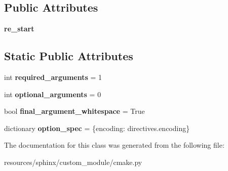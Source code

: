 \subsection*{Public Attributes}
\begin{DoxyCompactItemize}
\item 
\mbox{\label{classcmake_1_1CMakeModule_a8bdaac2e5425f8a443a797e31a2e3f24}} 
{\bfseries re\+\_\+start}
\end{DoxyCompactItemize}
\subsection*{Static Public Attributes}
\begin{DoxyCompactItemize}
\item 
\mbox{\label{classcmake_1_1CMakeModule_a8611294687a040b621ee65c24bdf4bf3}} 
int {\bfseries required\+\_\+arguments} = 1
\item 
\mbox{\label{classcmake_1_1CMakeModule_a5b3ba9afdee1ce2a9ef4a4372804586b}} 
int {\bfseries optional\+\_\+arguments} = 0
\item 
\mbox{\label{classcmake_1_1CMakeModule_a9101f08e555f3d9e7f45d766194bc50f}} 
bool {\bfseries final\+\_\+argument\+\_\+whitespace} = True
\item 
\mbox{\label{classcmake_1_1CMakeModule_adb45adc58cfd303e9efb70792cd2f7f4}} 
dictionary {\bfseries option\+\_\+spec} = \{\textquotesingle{}encoding\textquotesingle{}\+: directives.\+encoding\}
\end{DoxyCompactItemize}


The documentation for this class was generated from the following file\+:\begin{DoxyCompactItemize}
\item 
resources/sphinx/custom\+\_\+module/cmake.\+py\end{DoxyCompactItemize}
